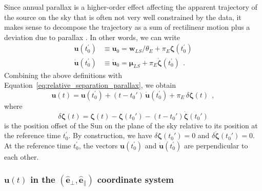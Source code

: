 \documentclass[12pt,dvipsnames]{report}
\renewcommand{\vec}[1]{\boldsymbol{\mathbf{#1}}}
\newcommand{\hquad}{~~}
\begin{document}
Since annual parallax is a higher-order effect affecting the apparent
trajectory of the source on the sky that is often not very well constrained by the data, 
it makes sense to decompose the trajectory as a sum of rectilinear motion plus a deviation 
due to parallax
\citep{2002ApJ...572..521A,2004ApJ...606..319G}. In other words, we can write 
\citep{2002ApJ...572..521A}
\begin{align}
    \vec{u}(t_0^\prime)&\equiv \vec{u}_0=\vec{w}_{LS}/\theta_E+\pi_E\vec{\zeta}(t_0^\prime)\\
    \dot{\vec u}(t_0^\prime)&\equiv \dot{\vec u}_0=\vec{\mu}_{LS}+\pi_E\dot{\vec{\zeta}}(t_0^\prime)
    \hquad.
\end{align}
Combining the above definitions with Equation~\ref{eq:relative_separation_parallax}, we obtain
\begin{equation}
    \boldsymbol{u}(t)=\mathbf{u}(t_0^\prime) + (t-t_0')\,\dot{\vec{u}}(t_0^\prime) +
    \pi_E\,\delta\vec\zeta(t)
    \hquad,
\end{equation}
where 
\begin{equation}
    \delta\boldsymbol \zeta (t)=\boldsymbol \zeta (t)-\boldsymbol \zeta (t_0')-(t-t_0')
    \boldsymbol{\dot \zeta} (t_0')
    \label{eq:relative_separation_parallax_decomposed}
\end{equation}
is the position offset of the Sun on the plane of the sky relative to its position 
at the reference time $t_0^\prime$. By construction, we have 
$\delta\boldsymbol \zeta (t_0')=0$ and $\delta\dot{\boldsymbol \zeta} (t_0')=0$.
At the reference time $t_0^\prime$, the vectors $\vec{u}(t_0^\prime)$ and 
$\dot{\vec u}(t_0^\prime)$ are perpendicular to each other.

\subsubsection{$\mathbf{u}(t)$ in the $(\mathbf{\hat e}_\bot,
        \mathbf{\hat e}_\parallel)$ coordinate system}%
\end{document}
